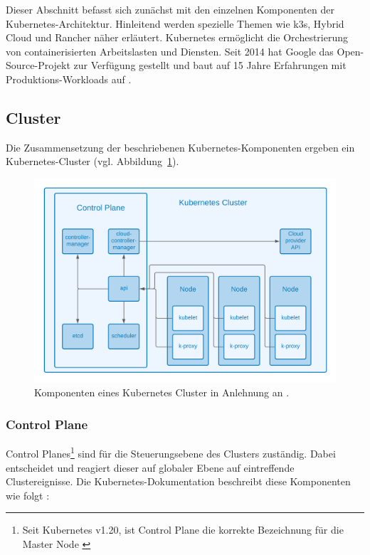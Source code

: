 Dieser Abschnitt befasst sich zunächst mit den einzelnen Komponenten der Kubernetes-Architektur.
Hinleitend werden spezielle Themen wie k3s, Hybrid Cloud und Rancher näher erläutert.
Kubernetes ermöglicht die Orchestrierung von containerisierten Arbeitslasten
und Diensten. Seit 2014 hat Google das Open-Source-Projekt zur Verfügung
gestellt und baut auf 15 Jahre Erfahrungen mit Produktions-Workloads auf \cite{kubernetes}.

\subsection{Cluster}
Die Zusammensetzung der beschriebenen Kubernetes-Komponenten ergeben ein Kubernetes-Cluster (vgl. Abbildung~\ref{fig:cluster}).


\begin{figure}[!htb]
    \centering
    \includegraphics[width=1.0\columnwidth]{images/KubernetesKomponenten.png}
    \caption{Komponenten eines Kubernetes Cluster in Anlehnung an \cite{kuberneteskomponenten}.}
    \label{fig:cluster}
\end{figure}

\subsubsection{Control Plane}
Control Planes\footnote{Seit Kubernetes v1.20, ist Control Plane die korrekte Bezeichnung für die Master Node \cite{Kuberneteschangemaster}} sind für die Steuerungsebene des Clusters zuständig.
Dabei entscheidet und reagiert dieser auf globaler Ebene auf eintreffende Clustereignisse.
Die Kubernetes-Dokumentation beschreibt diese Komponenten wie folgt \cite{kuberneteskomponenten}:

